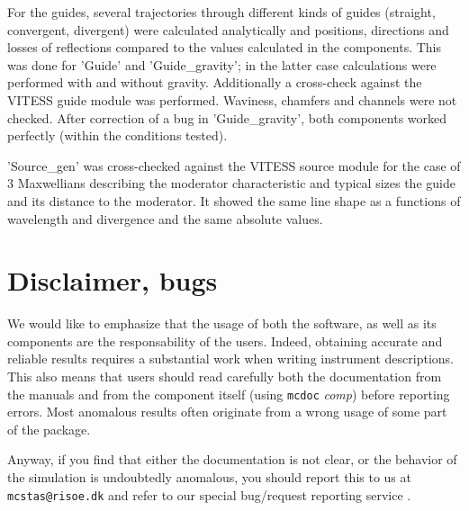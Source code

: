 For the guides, several trajectories through different kinds of guides (straight, convergent, divergent) were calculated analytically and positions, directions and losses of reflections compared to the values calculated in the components. This was done for 'Guide' and 'Guide\_gravity'; in the latter case calculations were performed with and without gravity. Additionally a cross-check against the VITESS guide module was performed. Waviness, chamfers and channels were not checked.
After correction of a bug in 'Guide\_gravity', both components worked perfectly (within the conditions tested).

'Source\_gen' was cross-checked against the VITESS source module for the case of 3 Maxwellians describing the moderator characteristic and typical sizes the guide and its distance to the moderator. It showed the same line shape as a functions of wavelength and divergence and the same absolute values.

\section{Disclaimer, bugs}

We would like to emphasize that the usage of both the \MCS software, as well as its components are the responsability of the users. Indeed, obtaining accurate and reliable results requires a substantial work when writing instrument descriptions. This also means that users should read carefully both the documentation from the manuals \cite{mcstasmanual} and from the component itself (using \verb+mcdoc+ \textit{comp}) before reporting errors. Most anomalous results often originate from a wrong usage of some part of the package.

Anyway, if you find that either the documentation is not clear, or the behavior of the simulation is undoubtedly anomalous, you should report this to us at \verb+mcstas@risoe.dk+ and refer to our special bug/request reporting service \cite{github_issue_webpage}.
